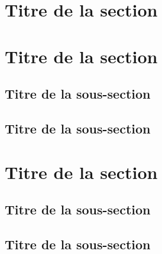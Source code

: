 \documentclass{article}
\begin{document}
\section{Titre de la section}

\lipsum[1-5]

\section{Titre de la section}


	\subsection{Titre de la sous-section}

\lipsum[6-7]


	\subsection{Titre de la sous-section}

\lipsum[8-9]


\section{Titre de la section}

	\subsection{Titre de la sous-section}

\lipsum[10-11]


	\subsection{Titre de la sous-section}

\lipsum[12-14]
\end{document}
